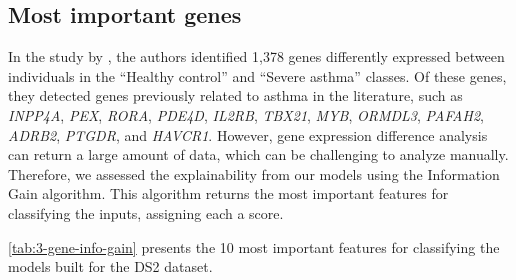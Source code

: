 \subsection{Most important genes} %

In the study by %
\cite{orsmark-pietras_transcriptome_2013}, the authors identified 1,378 genes differently expressed between individuals in the ``Healthy control'' and ``Severe asthma'' classes. Of these genes, they detected genes previously related to asthma in the literature, such as \textit{INPP4A}, \textit{PEX}, \textit{RORA}, \textit{PDE4D}, \textit{IL2RB}, \textit{TBX21}, \textit{MYB}, \textit{ORMDL3}, \textit{PAFAH2}, \textit{ADRB2}, \textit{PTGDR}, and \textit{HAVCR1}. However, gene expression difference analysis can return a large amount of data, which can be challenging to analyze manually. Therefore, we assessed the explainability from our models using the Information Gain algorithm. This algorithm returns the most important features for classifying the inputs, assigning each a score.

\autoref{tab:3-gene-info-gain} presents the 10 most important features for classifying the models built for the DS2 dataset.

